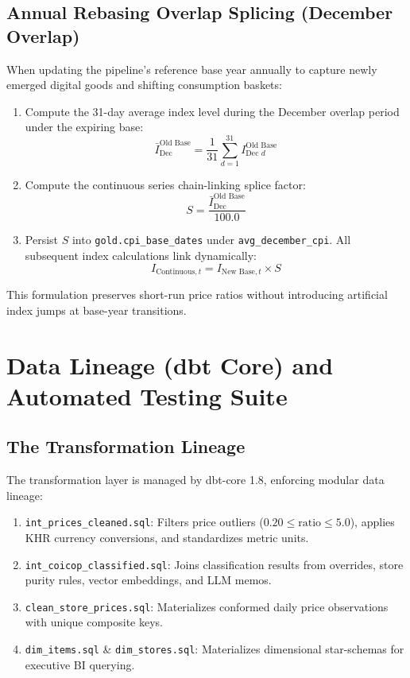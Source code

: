 \documentclass[11pt,a4paper,oneside]{article}
\begin{document}
\subsection{Annual Rebasing Overlap Splicing (December Overlap)}
When updating the pipeline's reference base year annually to capture newly emerged digital goods and shifting consumption baskets:
\begin{enumerate}
    \item Compute the 31-day average index level during the December overlap period under the expiring base:
    \begin{equation}
    \bar{I}_{\text{Dec}}^{\text{Old Base}} = \frac{1}{31} \sum_{d=1}^{31} I_{\text{Dec } d}^{\text{Old Base}}
    \end{equation}
    \item Compute the continuous series chain-linking splice factor:
    \begin{equation}
    S = \frac{\bar{I}_{\text{Dec}}^{\text{Old Base}}}{100.0}
    \end{equation}
    \item Persist $S$ into \texttt{gold.cpi\_base\_dates} under \texttt{avg\_december\_cpi}. All subsequent index calculations link dynamically:
    \begin{equation}
    I_{\text{Continuous}, t} = I_{\text{New Base}, t} \times S
    \end{equation}
\end{enumerate}
This formulation preserves short-run price ratios without introducing artificial index jumps at base-year transitions.

\newpage

\section{Data Lineage (dbt Core) and Automated Testing Suite}

\subsection{The Transformation Lineage}
The transformation layer is managed by dbt-core 1.8, enforcing modular data lineage:
\begin{enumerate}
    \item \texttt{int\_prices\_cleaned.sql}: Filters price outliers ($0.20 \le \text{ratio} \le 5.0$), applies KHR currency conversions, and standardizes metric units.
    \item \texttt{int\_coicop\_classified.sql}: Joins classification results from overrides, store purity rules, vector embeddings, and LLM memos.
    \item \texttt{clean\_store\_prices.sql}: Materializes conformed daily price observations with unique composite keys.
    \item \texttt{dim\_items.sql} \& \texttt{dim\_stores.sql}: Materializes dimensional star-schemas for executive BI querying.
\end{enumerate}
\end{document}
